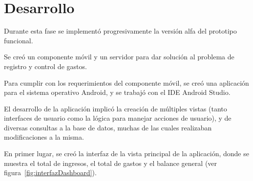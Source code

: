 \section{Desarrollo} \label{sect:desarrollo}

Durante esta fase se implementó progresivamente la versión alfa del prototipo funcional. 

Se creó un componente móvil y un servidor para dar solución al problema de registro y control de gastos.

Para cumplir con los requerimientos del componente móvil, se creó una aplicación para el sistema operativo Android, y se trabajó con el IDE Android Studio. 

El desarrollo de la aplicación implicó la creación de múltiples vistas (tanto interfaces de usuario como la lógica para manejar acciones de usuario), y de diversas consultas a la base de datos, muchas de las cuales realizaban modificaciones a la misma.

En primer lugar, se creó la interfaz de la vista principal de la aplicación, donde se muestra el total de ingresos, el total de gastos y el balance general (ver figura~\ref{fig:interfazDashboard}).

